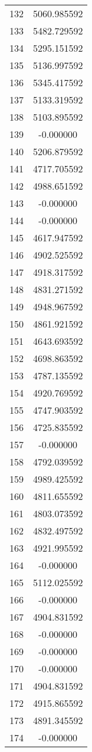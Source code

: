 \documentclass[12pt]{article}
\begin{document}
\begin{longtable}{@{}cc@{}}
132 & 5060.985592 \\
133 & 5482.729592 \\
134 & 5295.151592 \\
135 & 5136.997592 \\
136 & 5345.417592 \\
137 & 5133.319592 \\
138 & 5103.895592 \\
139 & -0.000000 \\
140 & 5206.879592 \\
141 & 4717.705592 \\
142 & 4988.651592 \\
143 & -0.000000 \\
144 & -0.000000 \\
145 & 4617.947592 \\
146 & 4902.525592 \\
147 & 4918.317592 \\
148 & 4831.271592 \\
149 & 4948.967592 \\
150 & 4861.921592 \\
151 & 4643.693592 \\
152 & 4698.863592 \\
153 & 4787.135592 \\
154 & 4920.769592 \\
155 & 4747.903592 \\
156 & 4725.835592 \\
157 & -0.000000 \\
158 & 4792.039592 \\
159 & 4989.425592 \\
160 & 4811.655592 \\
161 & 4803.073592 \\
162 & 4832.497592 \\
163 & 4921.995592 \\
164 & -0.000000 \\
165 & 5112.025592 \\
166 & -0.000000 \\
167 & 4904.831592 \\
168 & -0.000000 \\
169 & -0.000000 \\
170 & -0.000000 \\
171 & 4904.831592 \\
172 & 4915.865592 \\
173 & 4891.345592 \\
174 & -0.000000 \\

\end{longtable}
\end{document}
